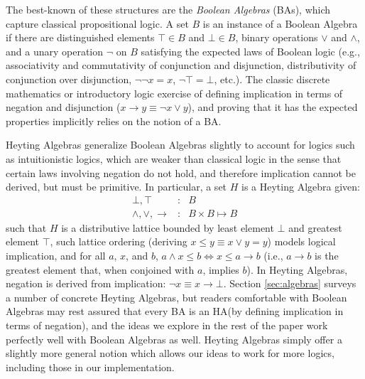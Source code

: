 \documentclass[11pt,a4paper,acceptedWithA]{article}
\newcommand{\ha}{\textsc{HA}\xspace}
\newcommand{\ba}{\textsc{BA}\xspace}
\newcommand{\bas}{\textsc{BA}s\xspace}
\begin{document}
The best-known of these structures are the \emph{Boolean Algebras} (\bas), which capture classical propositional logic. A set $B$ is an instance of a Boolean Algebra if there are distinguished elements $\top\in B$ and $\bot\in B$, binary operations $\vee$ and $\land$, and a unary operation $\neg$ on $B$ satisfying the expected laws of Boolean logic (e.g., associativity and commutativity of conjunction and disjunction, distributivity of conjunction over disjunction, $\neg\neg x=x$, $\neg\top=\bot$, etc.).
The classic discrete mathematics or introductory logic exercise of defining implication in terms of negation and disjunction ($x\rightarrow y\equiv \neg x\vee y$), and proving that it has the expected properties implicitly relies on the notion of a \ba.

Heyting Algebras generalize Boolean Algebras slightly to account for logics such as intuitionistic logics, which are weaker than classical logic in the sense that certain laws involving negation do not hold, and therefore implication cannot be derived, but must be primitive.
In particular, a set $H$ is a Heyting Algebra given:
\begin{eqnarray*}
\bot,\top &\mathrel{:}& B\\
\land,\vee,\rightarrow &\mathrel{:}& B\times B \mapsto B
\end{eqnarray*}
such that $H$ is a distributive lattice bounded by least element $\bot$ and greatest element $\top$, such lattice ordering (deriving $x\le y\equiv x\vee y=y$) models logical implication, and for all $a$, $x$, and $b$, $a\land x\le b \Leftrightarrow x\le a\rightarrow b$ (i.e., $a\rightarrow b$ is the greatest element that, when conjoined with $a$, implies $b$). In Heyting Algebras, negation is derived from implication: $\neg x\equiv x\rightarrow\bot$.
Section \ref{sec:algebras} surveys a number of concrete Heyting Algebras, but readers comfortable with Boolean Algebras may rest assured that every \ba is an \ha (by defining implication in terms of negation), and the ideas we explore in the rest of the paper work perfectly well with Boolean Algebras as well. Heyting Algebras simply offer a slightly more general notion which allows our ideas to work for more logics, including those in our implementation.

\end{document}
